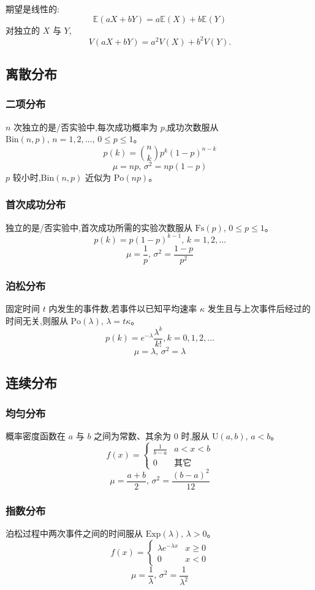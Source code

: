 期望是线性的:
\[\mathbb{E}(aX+bY) = a\mathbb{E}(X)+b\mathbb{E}(Y)\]
对独立的 $X$ 与 $Y$,\[V(aX+bY) = a^2V(X)+b^2V(Y).\]

\subsection{离散分布}

\subsubsection{二项分布}
$n$ 次独立的是/否实验中,每次成功概率为 $p$,成功次数服从 $\textrm{Bin}(n,p),\,n=1,2,\dots,\, 0\leq p\leq1$。
\[p(k)=\binom{n}{k}p^k(1-p)^{n-k}\]
\[\mu = np,\,\sigma^2=np(1-p)\]
$p$ 较小时,$\textrm{Bin}(n,p)$ 近似为 $\textrm{Po}(np)$。

\subsubsection{首次成功分布}
独立的是/否实验中,首次成功所需的实验次数服从 $\textrm{Fs}(p),\,0\leq p\leq1$。
\[p(k)=p(1-p)^{k-1},\,k=1,2,\dots\]
\[\mu = \frac1p,\,\sigma^2=\frac{1-p}{p^2}\]

\subsubsection{泊松分布}
固定时间 $t$ 内发生的事件数,若事件以已知平均速率 $\kappa$ 发生且与上次事件后经过的时间无关,则服从 $\textrm{Po}(\lambda),\,\lambda=t\kappa$。
\[p(k)=e^{-\lambda}\frac{\lambda^k}{k!}, k=0,1,2,\dots\]
\[\mu=\lambda,\,\sigma^2=\lambda\]

\subsection{连续分布}

\subsubsection{均匀分布}
概率密度函数在 $a$ 与 $b$ 之间为常数、其余为 0 时,服从 $\textrm{U}(a,b),\,a<b$。
\[f(x) = \left\{
\begin{array}{cl}
\frac{1}{b-a} & a<x<b\\
0 & \textrm{其它}
\end{array}\right.\]
\[\mu=\frac{a+b}{2},\,\sigma^2=\frac{(b-a)^2}{12}\]

\subsubsection{指数分布}
泊松过程中两次事件之间的时间服从 $\textrm{Exp}(\lambda),\,\lambda>0$。
\[f(x) = \left\{
\begin{array}{cl}
\lambda e^{-\lambda x} & x\geq0\\
0 & x<0
\end{array}\right.\]
\[\mu=\frac{1}{\lambda},\,\sigma^2=\frac{1}{\lambda^2}\]

